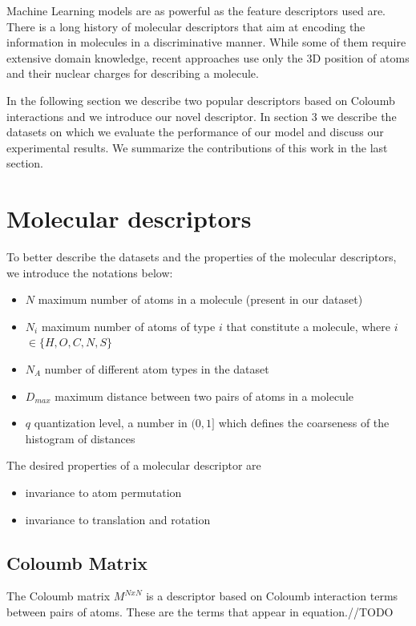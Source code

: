 \documentclass{article}
\begin{document}
Machine Learning models are as powerful as the feature descriptors used are. There is a long history of molecular descriptors \cite{todeschini2000handbook} that aim at encoding the information in molecules in a discriminative manner. While some of them require extensive domain knowledge, recent approaches \cite{initialcoloumb} use only the 3D position of atoms and their nuclear charges for describing a molecule.

In the following section we describe two popular descriptors based on Coloumb interactions and we introduce our novel descriptor. In section 3 we describe the datasets on which we evaluate the performance of our model and discuss our experimental results. We summarize the contributions of this work in the last section.

\section{Molecular descriptors}

To better describe the datasets and the properties of the molecular descriptors, we introduce the notations below:
\begin{itemize}
\item $N$ maximum number of atoms in a molecule (present in our dataset)
\item $N_i$ maximum number of atoms of type $i$ that constitute a molecule, where $i$ $\in \{H, O, C, N, S\}$
\item $N_A$ number of different atom types in the dataset
\item $D_{max}$ maximum distance between two pairs of atoms in a molecule
\item $q$ quantization level, a number in $(0,1]$ which defines the coarseness of the histogram of distances
\end{itemize}
The desired properties of a molecular descriptor are
\begin{itemize}
 \item invariance to atom permutation
 \item invariance to translation and rotation
\end{itemize}

\subsection{Coloumb Matrix}
The Coloumb matrix\citep{initialcoloumb} $M^{NxN}$ is a descriptor based on  Coloumb interaction terms between pairs of atoms. These are the terms that appear in equation.//TODO
\end{document}
